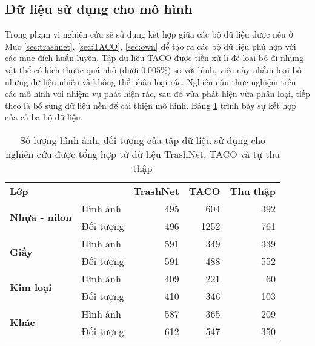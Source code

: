 \documentclass[../the.tex]{subfiles}
\begin{document}
\subsection{Dữ liệu sử dụng cho mô hình}
{\fontsize{13}{12} \selectfont

	Trong phạm vi nghiên cứu sẽ sử dụng kết hợp giữa các bộ dữ liệu được nêu ở Mục \ref{sec:trashnet}, \ref{sec:TACO}, \ref{sec:own} để tạo ra các bộ dữ liệu phù hợp với các mục đích huấn luyện.
	Tập dữ liệu TACO được tiền xử lí để loại bỏ đi những vật thể có kích thước quá nhỏ (dưới 0,005\%) so với hình, việc này nhằm loại bỏ những dữ liệu nhiễu và không thể phân loại rác.
	Nghiên cứu thực nghiệm trên các mô hình với nhiệm vụ phát hiện rác, sau đó vừa phát hiện vừa phân loại, tiếp theo là bổ sung dữ liệu nền để cải thiện mô hình.
	Bảng \ref{tab:datasetmain} trình bày sự kết hợp của cả ba bộ dữ liệu.

}

\begin{table}[!ht]
	\centering
	\caption{Số lượng hình ảnh, đối tượng của tập dữ liệu sử dụng cho nghiên cứu được tổng hợp từ dữ liệu TrashNet, TACO và tự thu thập}
	\begin{tabular}{|l|l|r|r|r|}
		\cline{1-5}
		\textbf{Lớp}                           &            &\textbf{TrashNet} & \textbf{TACO} & \textbf{Thu thập} \\ \cline{1-5}
		\multirow{2}{*}{\textbf{Nhựa - nilon}} & Hình ảnh   & 495               & 604           & 392               \\ \cline{2-5}
		                                       & Đối tượng  & 496               & 1252          & 761               \\ \cline{1-5}
		\multirow{2}{*}{\textbf{Giấy}}         & Hình ảnh   & 591               & 349           & 339               \\ \cline{2-5}
		                                       & Đối tượng  & 591               & 488           & 552               \\ \cline{1-5}
		\multirow{2}{*}{\textbf{Kim loại}}     & Hình ảnh   & 409               & 221           & 60                \\ \cline{2-5}
		                                       & Đối tượng  & 410               & 346           & 103               \\ \cline{1-5}
		\multirow{2}{*}{\textbf{Khác}}     & Hình   ảnh & 587               & 365           & 209               \\ \cline{2-5}
		                                       & Đối tượng  & 612               & 547           & 350               \\ \cline{1-5}
	\end{tabular}
	\label{tab:datasetmain}
\end{table}
\end{document}
